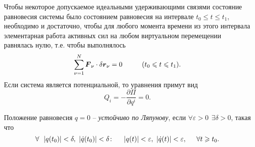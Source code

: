 


\begin{to_thr}
    Чтобы некоторое допускаемое идеальными удерживающими связями состояние равновесия системы было состоянием равновесия на интервале $t_0 \leq t \leq t_1$, необходимо и достаточно, чтобы для любого момента времени из этого интервала элементарная работа активных сил на любом виртуальном перемещении равнялась нулю, т.е. чтобы выполнялось
    \begin{equation*}
         \sum_{\nu=1}^N \mbox{\boldmath $F$}_\nu \cdot \delta \mbox{\boldmath $r$}_\nu = 0 
         \hspace{1cm}
         (t_0 \leqslant t \leqslant t_1).
     \end{equation*} 
     Если система является потенциальной, то уравнения примут вид
     \begin{equation*}
         Q_i = - \frac{\partial \Pi}{\partial q^i} = 0.
     \end{equation*}
\end{to_thr}





\begin{to_def} 
    Положение равновесия $q=0$ -- \textit{устойчиво по Ляпунову}, если $\forall \varepsilon > 0 \ \ \exists \delta > 0$, такая что 
\begin{equation}
    \forall \ \ |q(t_0)|<\delta, \ |\dot{q}(t_0)|<\delta \colon
    \hspace{0.5cm} 
    |q(t)|<\varepsilon, \ |\dot{q}(t)| < \varepsilon, \hspace{0.5cm} \forall t \geq t_0.
\end{equation}
\end{to_def}

